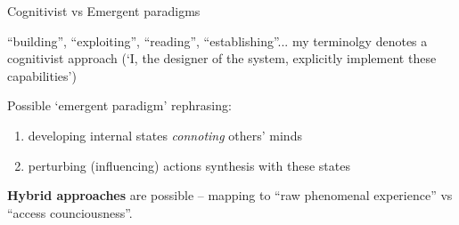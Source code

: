 \documentclass[compress]{beamer}
\begin{document}

{
\begin{frame}{Cognitivist vs Emergent paradigms}

    ``building'', ``exploiting'', ``reading'', ``establishing''... my terminolgy
    denotes a cognitivist approach (`I, the designer of the system, explicitly implement
    these capabilities')

    \pause
    
    Possible `emergent paradigm' rephrasing:

    \begin{enumerate}
        \item developing internal states \emph{connoting} others' minds
        \item perturbing (influencing) actions synthesis with these states
    \end{enumerate}

    \pause

    {\bf Hybrid approaches} are possible -- mapping to ``raw phenomenal experience'' vs
    ``access counciousness''.
\end{frame}
}

\end{document}
